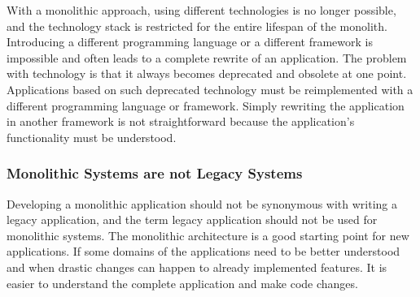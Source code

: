 \bigskip

\noindent With a monolithic approach, using different technologies is no longer possible, and the technology stack is restricted for the entire lifespan of the monolith. Introducing a different programming language or a different framework is impossible and often leads to a complete rewrite of an application. \cite[6-7]{book:2018:richardson:background:bff:microservices-patterns} The problem with technology is that it always becomes deprecated and obsolete at one point. Applications based on such deprecated technology must be reimplemented with a different programming language or framework. Simply rewriting the application in another framework is not straightforward because the application's functionality must be understood.

\subsubsection{Monolithic Systems are not Legacy Systems}\label{subsection:background:software-monolith:not-legacy-systems}

Developing a monolithic application should not be synonymous with writing a legacy application, and the term legacy application should not be used for monolithic systems. \cite[15]{book:2019:newman:background:monolith:monolith-to-microservices} The monolithic architecture is a good starting point for new applications. If some domains of the applications need to be better understood and when drastic changes can happen to already implemented features. It is easier to understand the complete application and make code changes. \cite[43]{book:2019:newman:background:monolith:monolith-to-microservices}

